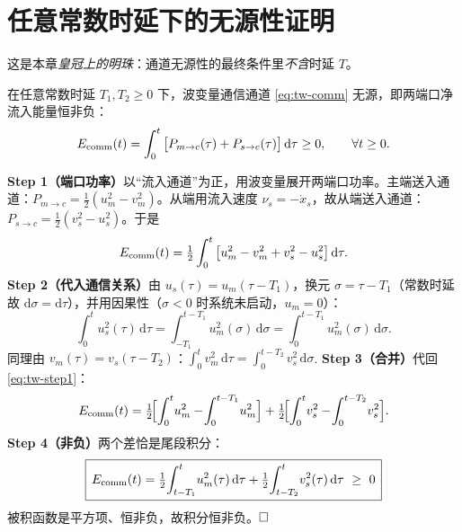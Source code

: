 \section{任意常数时延下的无源性证明}
\label{sec:tw-delayproof}

这是本章\emph{皇冠上的明珠}：通道无源性的最终条件里\emph{不含}时延 $T$。

\begin{theorem}[通道时延无源性]\label{thm:tw-channel}
在任意常数时延 $T_1,T_2\ge0$ 下，波变量通信通道 \cref{eq:tw-comm} 无源，即两端口净流入能量恒非负：
\begin{equation}
  E_{\rm comm}(t)=\int_0^t\big[P_{m\to c}(\tau)+P_{s\to c}(\tau)\big]\,\mathrm d\tau\ge0,\qquad\forall t\ge0.
  \label{eq:tw-Ecomm-def}
\end{equation}
\end{theorem}

\begin{derivation}[四步证明]
\textbf{Step 1（端口功率）}\;以“流入通道”为正，用波变量展开两端口功率。主端送入通道：$P_{m\to c}=\tfrac12(u_m^2-v_m^2)$。从端用流入速度 $\nu_s=-\dot x_s$，故从端送入通道：$P_{s\to c}=\tfrac12(v_s^2-u_s^2)$。于是
\begin{equation}
  E_{\rm comm}(t)=\tfrac12\int_0^t\big[u_m^2-v_m^2+v_s^2-u_s^2\big]\,\mathrm d\tau.
  \label{eq:tw-step1}
\end{equation}
\textbf{Step 2（代入通信关系）}\;由 $u_s(\tau)=u_m(\tau-T_1)$，换元 $\sigma=\tau-T_1$（常数时延故 $\mathrm d\sigma=\mathrm d\tau$），并用因果性（$\sigma<0$ 时系统未启动，$u_m=0$）：
\begin{equation}
  \int_0^t u_s^2(\tau)\,\mathrm d\tau=\int_{-T_1}^{t-T_1}u_m^2(\sigma)\,\mathrm d\sigma=\int_0^{t-T_1}u_m^2(\sigma)\,\mathrm d\sigma.
  \label{eq:tw-step2a}
\end{equation}
同理由 $v_m(\tau)=v_s(\tau-T_2)$：$\int_0^t v_m^2\,\mathrm d\tau=\int_0^{t-T_2}v_s^2\,\mathrm d\sigma$.
\textbf{Step 3（合并）}\;代回 \cref{eq:tw-step1}：
\begin{equation}
  E_{\rm comm}(t)=\tfrac12\!\Big[\!\int_0^t\! u_m^2-\!\int_0^{t-T_1}\! u_m^2\Big]+\tfrac12\!\Big[\!\int_0^t\! v_s^2-\!\int_0^{t-T_2}\! v_s^2\Big].
  \label{eq:tw-step3}
\end{equation}
\textbf{Step 4（非负）}\;两个差恰是尾段积分：
\begin{equation}
  \boxed{\,E_{\rm comm}(t)=\tfrac12\!\int_{t-T_1}^{t}\! u_m^2(\tau)\,\mathrm d\tau+\tfrac12\!\int_{t-T_2}^{t}\! v_s^2(\tau)\,\mathrm d\tau\ \ge\ 0\,}
  \label{eq:tw-Ecomm-final}
\end{equation}
被积函数是平方项、恒非负，故积分恒非负。$\hfill\square$
\end{derivation}


